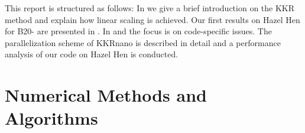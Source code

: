 \documentclass [a4paper, 12pt]{article}
\begin{document}
This report is structured as follows:
In  we give a brief introduction on the KKR method and explain how
linear scaling is achieved.
Our first results on Hazel Hen for B20- are presented in .
In  and  the focus is on code-specific issues. 
The parallelization scheme of KKRnano
is described in detail and a performance analysis of our code on Hazel Hen is conducted.

\section{Numerical Methods and Algorithms}
\label{sec:methods_algorithms}
 
\end{document}
